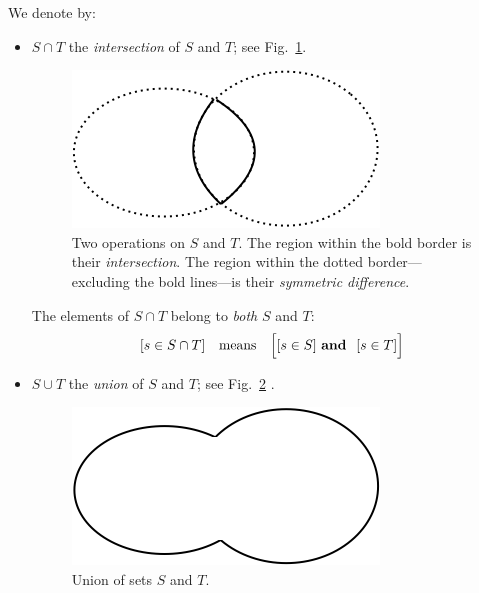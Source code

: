 \noindent
We denote by:
\begin{itemize}
\item
$S \cap T$ the {\it intersection} of $S$ and $T$; see Fig.~\ref{fig:setIntersection}.
\begin{figure}[htb]
\begin{center}
        \includegraphics[scale=0.4]{FiguresMaths/setIntersection}
        \caption{Two operations on $S$ and $T$. The region within the bold border is their {\em intersection}. The region within the dotted border---excluding the bold lines---is their {\em symmetric difference}.}
        \label{fig:setIntersection}
\end{center}
\end{figure}

\smallskip

The elements of $S \cap T$ belong to {\em both} $S$ and $T$:
\[ [s \in S \cap T] \ \ \mbox{ means } \ \ 
\Big[ [s \in S] \ \mbox{\bf and } \ [s \in T] \Big]
\]

\item
$S \cup T$ the {\it union} of $S$ and $T$; see Fig.~\ref{fig:setUnion} .
\begin{figure}[htb]
\begin{center}
        \includegraphics[scale=0.4]{FiguresMaths/setUnion}
        \caption{Union of sets $S$ and $T$.}
        \label{fig:setUnion}
\end{center}
\end{figure}

\smallskip


\end{itemize}
